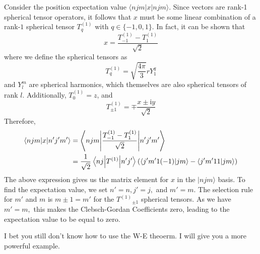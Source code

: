 \documentclass{article}
\begin{document}
	
	Consider the position expectation value $\langle njm|x|njm\rangle  $. Since vectors are rank-1 spherical tensor operators, it follows that $x$ must be some linear combination of a rank-$1$ spherical tensor $T_{q}^{(1)}$ with $q\in \{-1,0,1\}$. In fact, it can be shown that
	\begin{equation*}
		x=\frac{T_{-1}^{(1)} -T_{1}^{(1)}}{\sqrt{2}}
	\end{equation*}
	where we define the spherical tensors as
	\begin{equation*}
		T_{q}^{(1)} =\sqrt{\frac{4\pi }{3}} rY_{1}^{q}
	\end{equation*}
	and $Y_{l}^{m}$ are spherical harmonics, which themselves are also spherical tensors of rank $l$. Additionally, $T_{0}^{(1)} =z$, and
	\begin{equation*}
		T_{\pm 1}^{(1)} =\mp \frac{x\pm \mathrm{i} y}{\sqrt{2}}
	\end{equation*}
	Therefore,
	\begin{equation*}
		\begin{aligned}
			\langle  njm|x|n'j'm'\rangle   & =\mel**{njm}{\frac{T_{-1}^{(1)} -T_{1}^{(1)}}{\sqrt{2}}}{n'j'm'}\\
			& =\frac{1}{\sqrt{2}}\mel**{nj}{T^{( 1)}}{n'j'}\left(\bra{j'm'1( -1)}\ket{jm} -\bra{j'm'11}\ket{jm}\right)
		\end{aligned}
	\end{equation*}
	The above expression gives us the matrix element for $x$ in the $|njm\rangle  $ basis. To find the expectation value, we set $n'=n,j'=j,$ and $m'=m.$ The selection rule for $m'$ and $m$ is $m\pm 1=m'$ for the $T^{(1)}{}_{\pm 1}$ spherical tensors. As we have $m'=m,$ this makes the Clebsch-Gordan Coefficients zero, leading to the expectation value to be equal to zero.
	
	
	
	I bet you still don't know how to use the W-E theoerm. I will give you a more powerful example. 
	
\end{document}
